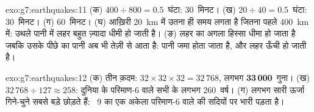 \begin{solution}{exo:g7:earthquakes:11}
(क) $400 \div 800 = 0.5$~घंटा: 30~मिनट। (ख) $20 \div 40 = 0.5$~घंटा:
30~मिनट। (ग) 60~मिनट। (घ) आख़िरी \qty{20}{km} में उतना ही समय लगता है जितना
पहले \qty{400}{km} में: उथले पानी में लहर बहुत ज़्यादा धीमी हो जाती है। (ङ)
लहर का अगला हिस्सा धीमा हो जाता है जबकि उसके पीछे का पानी अब भी तेज़ी से आता है:
पानी जमा होता जाता है, और लहर ऊँची हो जाती है।
\end{solution}

\begin{solution}{exo:g7:earthquakes:12}
(क) तीन क़दम: $32 \times 32 \times 32 = 32\,768$, लगभग
\textbf{33\,000}~गुना। (ख) $32\,768 \div 127 \approx 258$: दुनिया के परिमाण-6
वाले सभी  के लगभग 260~वर्ष। (ग) लगभग सारी ऊर्जा गिने-चुने सबसे बड़े 
छोड़ते हैं: ~9 का एक अकेला  परिमाण-6 वाले  की सदियों पर भारी
पड़ता है।
\end{solution}

